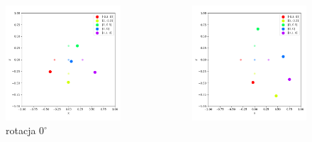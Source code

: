 \begin{frame}{}
    \begin{columns}
        \begin{column}{0.5\textwidth}
            \begin{figure}
                \centering
                \includegraphics[width=\textwidth]{../pics/mult_lat_2d_angle/positions_0_mean.png}
                \caption{rotacja $0^{\circ}$}
            \end{figure}
        \end{column}
        \begin{column}{0.5\textwidth}
            \begin{figure}
                \centering
                \includegraphics[width=\textwidth]{../pics/mult_lat_2d_angle/positions_45_mean.png}

\end{figure}
\end{column}
\end{columns}
\end{frame}
